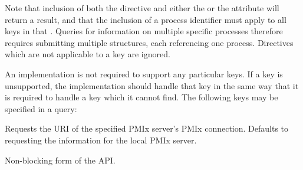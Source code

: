 Note that inclusion of both the  directive and either the  or the  attribute will return a  result, and that the inclusion of a process identifier must apply to all keys in that . Queries for information on multiple specific processes therefore requires submitting multiple  structures, each referencing one process.  Directives which are not applicable to a key are ignored.

\reqattrend

An implementation is not required to support any particular keys.  If a key is unsupported, the implementation should handle that key in the same way that it is required to handle a key which it cannot find.
The following keys may be specified in a query:

 Requests the URI of the specified \ac{PMIx} server's \ac{PMIx} connection. Defaults to requesting the information for the local \ac{PMIx} server.
\pasteAttributeItemEnd
{}


\descr

Non-blocking form of the  \ac{API}.



